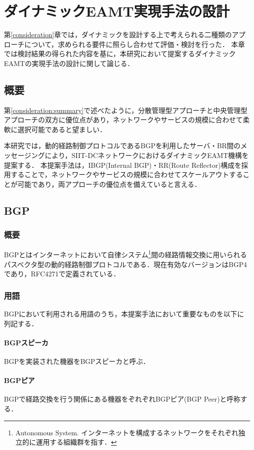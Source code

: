 \chapter{ダイナミックEAMT実現手法の設計}
\label{proposal}
第\ref{consideration}章では，ダイナミックを設計する上で考えられる二種類のアプローチについて，求められる要件に照らし合わせて評価・検討を行った．
本章では検討結果の得られた内容を基に，本研究において提案するダイナミックEAMTの実現手法の設計に関して論じる．

\section{概要}
第\ref{consideration:summary}で述べたように，分散管理型アプローチと中央管理型アプローチの双方に優位点があり，ネットワークやサービスの規模に合わせて柔軟に選択可能であると望ましい．

本研究では，動的経路制御プロトコルであるBGPを利用したサーバ・BR間のメッセージングにより，SIIT-DCネットワークにおけるダイナミックEAMT機構を提案する．
本提案手法は，IBGP(Internal BGP)・RR(Route Reflector)構成を採用することで，ネットワークやサービスの規模に合わせてスケールアウトすることが可能であり，両アプローチの優位点を備えていると言える．


\section{BGP}
\subsection{概要}
BGPとはインターネットにおいて自律システム\footnote{Autonomous System. インターネットを構成するネットワークをそれぞれ独立的に運用する組織群を指す．}間の経路情報交換に用いられるパスベクタ型の動的経路制御プロトコルである．現在有効なバージョンはBGP4であり，RFC4271で定義されている\cite{RFC4271}．


\subsection{用語}
BGPにおいて利用される用語のうち，本提案手法において重要なものを以下に列記する．

\subsubsection{BGPスピーカ}
BGPを実装された機器をBGPスピーカと呼ぶ．

\subsubsection{BGPピア}
BGPで経路交換を行う関係にある機器をぞれぞれBGPピア(BGP Peer)と呼称する．

